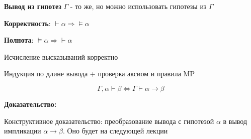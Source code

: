 \textbf{Вывод из гипотез} $\Gamma$ - то же, но можно использовать гипотезы из $\Gamma$


 \textbf{Корректность}: $\vdash\alpha \Rightarrow \models\alpha$

 \textbf{Полнота}: $\models\alpha \Rightarrow \vdash\alpha$



Исчисление высказываний корректно
\



Индукция по длине вывода + проверка аксиом и правила MP


$$\Gamma,\alpha\vdash\beta \Leftrightarrow \Gamma\vdash\alpha\rightarrow\beta$$

\textbf{Доказательство:}

Конструктивное доказательство: преобразование вывода с гипотезой $\alpha$ в вывод импликации $\alpha\rightarrow\beta$. Оно будет на следующей лекции

